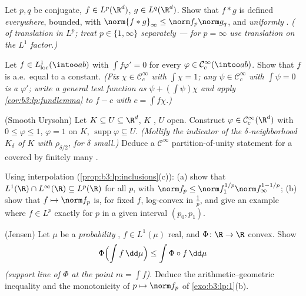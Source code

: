 \begin{exercise}[$\star\star$]\label{exo:b3:lp:6}
Let $p, q$ be conjugate, $f \in L^p(\R^d)$, $g \in
L^q(\R^d)$. Show that $f * g$ is defined \emph{everywhere},
bounded, with $\norm{f*g}_\infty \leq \norm f_p\norm g_q$, and
\emph{uniformly }. \emph{( of translation
in $L^p$; treat $p \in \{1, \infty\}$ separately --- for $p =
\infty$ use translation  on the $L^1$ factor.)}
\end{exercise}

\begin{exercise}[$\star\star$]\label{exo:b3:lp:7}
Let $f \in L^1_{\mathrm{loc}}(\intoo ab)$ with
$\int f\varphi' = 0$ for every $\varphi \in \mathcal
C^\infty_c(\intoo ab)$. Show that $f$ is a.e.\ equal to a
constant. \emph{(Fix $\chi \in \mathcal C_c^\infty$ with
$\int\chi = 1$; any $\psi \in \mathcal C_c^\infty$ with
$\int\psi = 0$ is a $\varphi'$; write a general test function
as $\psi + (\int\psi)\chi$ and apply
\cref{cor:b3:lp:fundlemma} to $f - c$ with $c = \int
f\chi$.)}
\end{exercise}

\begin{exercise}[$\star\star\star$]\label{exo:b3:lp:8}
(Smooth Urysohn) Let $K \subseteq U \subseteq \R^d$, $K$
, $U$ open. Construct $\varphi \in \mathcal
C^\infty_c(\R^d)$ with $0 \leq \varphi \leq 1$, $\varphi = 1$
on $K$, $\operatorname{supp}\varphi \subseteq U$.
\emph{(Mollify the indicator of the $\delta$-neighborhood
$K_\delta$ of $K$ with $\rho_{\delta/2}$, for $\delta$ small.)}
Deduce a $\mathcal C^\infty$ partition-of-unity statement for
a  covered by finitely many .
\end{exercise}

\begin{exercise}[$\star\star$]\label{exo:b3:lp:9}
Using interpolation (\cref{prop:b3:lp:inclusions}(c)):
(a) show that $L^1(\R)\cap L^\infty(\R) \subseteq L^p(\R)$ for
all $p$, with $\norm f_p \leq \norm f_1^{1/p}\norm
f_\infty^{1 - 1/p}$;
(b) show that $f \mapsto \norm f_p$ is, for fixed $f$,
log-convex in $\frac1p$, and give an example where $f \in L^p$
exactly for $p$ in a given interval $(p_0, p_1)$.
\end{exercise}

\begin{exercise}[$\star\star$]\label{exo:b3:lp:10}
(Jensen) Let $\mu$ be a \emph{probability} , $f \in
L^1(\mu)$ real, and $\Phi \colon \R \to \R$ convex. Show
\[
\Phi\Bigl(\int f\,\dd\mu\Bigr) \leq \int \Phi\circ
f\,\dd\mu
\]
\emph{(support line of $\Phi$ at the point $m = \int f$)}.
Deduce the arithmetic--geometric inequality and the
monotonicity of $p \mapsto \norm f_p$ of
\cref{exo:b3:lp:1}(b).
\end{exercise}

